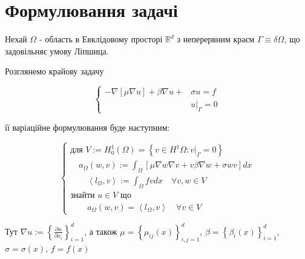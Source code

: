 \section{Формулювання задачі}

Нехай $\Omega$ - область в Евклідовому просторі $\mathbb{R}^d$ з неперервним краєм $\Gamma \equiv \delta \Omega$, що задовільняє умову Ліпшица.

Розглянемо крайову задачу

\begin{equation}\label{eq:general_boundary}
	\begin{cases}
			- \nabla [\mu \nabla u] + \beta \nabla u + &\sigma u = f  \\
			&u|_\Gamma = 0
	\end{cases}
\end{equation}

її варіаційне формулювання буде наступним:

\begin{equation}\label{eq:general_variational}
	\begin{cases}
		\mbox{для } V := H_0^1 \left( \Omega \right) = 
		\left\lbrace 
			v \in H^1 \Omega : v|_\Gamma = 0
		\right\rbrace \\
		
		\quad a_\Omega(w,v) := \displaystyle\int_\Omega 
		\left[
			\mu \nabla w \nabla v +v \beta \nabla w + \sigma wv
		\right] dx \\
		
		\qquad \left\langle l_\Omega, v \right\rangle := \displaystyle\int_\Omega fvdx \quad \forall v,w \in V \\
		
		\mbox{знайти }u \in V \mbox{ що} \\
		
		\qquad a_\Omega(w,v) = \left\langle l_\Omega, v \right\rangle \quad \forall v \in V
		
	\end{cases}
\end{equation}

Тут $\nabla u := \left\lbrace \frac{\partial u}{\partial x_i} \right\rbrace_{i=1}^d$, 
	а також $\mu = \left\lbrace \mu_{ij}(x) \right\rbrace_{i,j=1}^d$,
	$\beta = \left\lbrace \beta_i(x) \right\rbrace_{i=1}^d$,
	$\sigma = \sigma(x)$,
	$f = f(x)$

